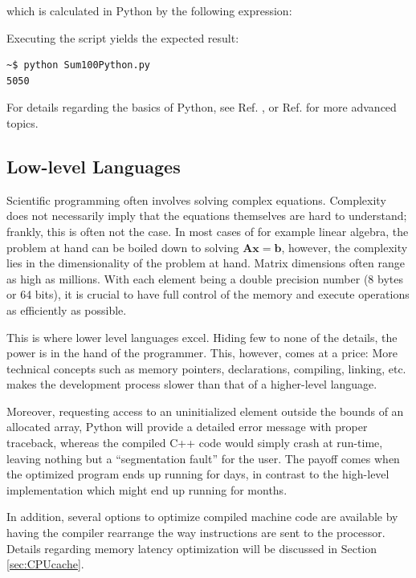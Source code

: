 which is calculated in Python by the following expression:



Executing the script yields the expected result:

\begin{verbatim}
~$ python Sum100Python.py 
5050
\end{verbatim}

For details regarding the basics of Python, see Ref. \cite{inf1100}, or Ref. \cite{inf3331} for more advanced topics.  


\subsection{Low-level Languages}
\label{sec:lowlevel}

Scientific programming often involves solving complex equations. Complexity does not necessarily imply that the equations themselves are hard to understand; frankly, this is often not the case. In most cases of for example linear algebra, the problem at hand can be boiled down to solving $\mathbf{A}\mathbf{x} = \mathbf{b}$, however, the complexity lies in the dimensionality of the problem at hand. Matrix dimensions often range as high as millions. With each element being a double precision number (8 bytes or 64 bits), it is crucial to have full control of the memory and execute operations as efficiently as possible. 

This is where lower level languages excel. Hiding few to none of the details, the power is in the hand of the programmer. This, however, comes at a price: More technical concepts such as memory pointers, declarations, compiling, linking, etc. makes the development process slower than that of a higher-level language. 

Moreover, requesting access to an uninitialized element outside the bounds of an allocated array, Python will provide a detailed error message with proper traceback, whereas the compiled C++ code would simply crash at run-time, leaving nothing but a ``segmentation fault'' for the user. The payoff comes when the optimized program ends up running for days, in contrast to the high-level implementation which might end up running for months.

In addition, several options to optimize compiled machine code are available by having the compiler rearrange the way instructions are sent to the processor. Details regarding memory latency optimization will be discussed in Section \ref{sec:CPUcache}. 


